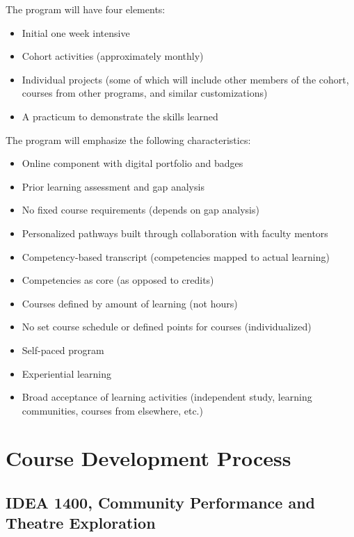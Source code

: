\documentclass[letterpaper,10pt,headsepline]{scrreprt}
\begin{document}
The program will have four elements:

\begin{itemize}
\itemsep1pt\parskip0pt
\item
  Initial one week intensive
\item
  Cohort activities (approximately monthly)
\item
  Individual projects (some of which will include other members of the
  cohort, courses from other programs, and similar customizations)
\item
  A practicum to demonstrate the skills learned
\end{itemize}

The program will emphasize the following characteristics:

\begin{itemize}
\itemsep1pt\parskip0pt
\item
  Online component with digital portfolio and badges
\item
  Prior learning assessment and gap analysis
\item
  No fixed course requirements (depends on gap analysis)
\item
  Personalized pathways built through collaboration with faculty mentors
\item
  Competency-based transcript (competencies mapped to actual learning)
\item
  Competencies as core (as opposed to credits)
\item
  Courses defined by amount of learning (not hours)
\item
  No set course schedule or defined points for courses (individualized)
\item
  Self-paced program
\item
  Experiential learning
\item
  Broad acceptance of learning activities (independent study, learning
  communities, courses from elsewhere, etc.)
\end{itemize}

\chapter{Course Development Process}

\section{IDEA 1400, Community Performance and Theatre Exploration}
\end{document}
